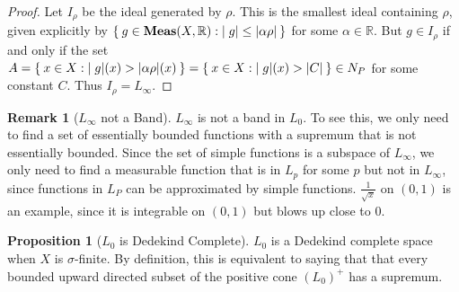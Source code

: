 \documentclass[letterpaper,10pt,oneside,onecolumn,reqno]{amsart}
\newcommand{\R}{\mathbb R}
\theoremstyle{definition}
\newtheorem{pro}[thm]{Proposition}
\newtheorem{rem}{Remark}
\newcommand{\catname}[1]{{\normalfont\textbf{#1}}}
\newcommand{\Meas}{\catname{Meas}}
\begin{document}
\begin{proof}
  Let $I_{\rho}$ be the ideal generated by $\rho$. This is the
  smallest ideal containing $\rho$, given explicitly by $\Set{g \in
    \Meas(X, \R) : |g| \leq |\alpha \rho|}$ for some $\alpha \in
  \R$. But $g \in I_{\rho}$ if and only if the set $A = \Set{x \in X :
    |g|(x) > |\alpha \rho|(x)} = \Set{x \in X : |g|(x) > |C|} \in N_P$
  for some constant $C$. Thus $I_{\rho} = L_{\infty}$.
\end{proof}

\begin{rem}[$L_{\infty}$ not a Band]\label{rem:6}
  $L_{\infty}$ is not a band in $L_0$. To see this, we only need to
  find a set of essentially bounded functions with a supremum that is
  not essentially bounded. Since the set of simple functions is a
  subspace of $L_{\infty}$, we only need to find a measurable function
  that is in $L_p$ for some $p$ but not in $L_{\infty}$, since
  functions in $L_P$ can be approximated by simple
  functions. $\frac{1}{\sqrt{x}}$ on $(0,1)$ is an example, since it
  is integrable on $(0,1)$ but blows up close to $0$.
\end{rem}

\begin{pro}[$L_{0}$ is Dedekind Complete]\label{pro:5}
  $L_{0}$ is a Dedekind complete space when $X$ is $\sigma$-finite. By
  definition, this is equivalent to saying that that every bounded
  upward directed subset of the positive cone $(L_0)^+$ has a
  supremum.
\end{pro}
\end{document}
